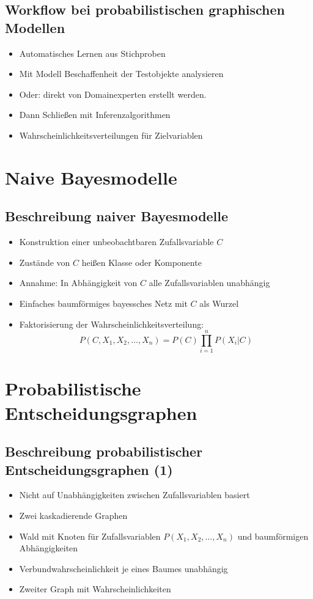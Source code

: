 \documentclass[a5paper,16pt,oneside,landscape]{scrartcl}
\begin{document}
  \subsection*{Workflow bei probabilistischen graphischen Modellen}
  \begin{itemize}
    \item Automatisches Lernen aus Stichproben 
    \item Mit Modell Beschaffenheit der Testobjekte analysieren
    \item Oder: direkt von Domainexperten erstellt werden. 
    \item Dann Schließen mit Inferenzalgorithmen
    \item Wahrscheinlichkeitsverteilungen für Zielvariablen
  \end{itemize}


\section{Naive Bayesmodelle}


  \subsection*{Beschreibung naiver Bayesmodelle}
  \begin{itemize}
    \item Konstruktion einer unbeobachtbaren Zufallsvariable $C$
    \item Zustände von $C$ heißen Klasse oder Komponente
    \item Annahme: In Abhängigkeit von $C$ alle Zufallsvariablen unabhängig
    \item Einfaches baumförmiges bayessches Netz mit $C$ als Wurzel
    \item Faktorisierung der Wahrscheinlichkeitsverteilung: 
\[ P(C,X_1,X_2,\dots,X_n) = P(C) \prod_{i=1}^n P(X_i|C) \]
  \end{itemize}


\section{Probabilistische Entscheidungsgraphen}


  \subsection*{Beschreibung probabilistischer Entscheidungsgraphen (1)}
  \begin{itemize}
    \item Nicht auf Unabhängigkeiten zwischen Zufallsvariablen basiert
    \item Zwei kaskadierende Graphen
    \item Wald mit Knoten für Zufallsvariablen $P(X_1,X_2,\dots,X_n)$ und baumförmigen Abhängigkeiten
    \item Verbundwahrscheinlichkeit je eines Baumes unabhängig
    \item Zweiter Graph mit Wahrscheinlichkeiten
  \end{itemize}
\end{document}
